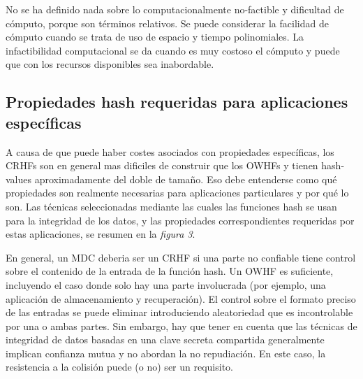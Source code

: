 \documentclass[a4paper, 12pt]{article} %
\begin{document}
No se ha definido nada sobre lo computacionalmente no-factible y dificultad de cómputo, porque son
términos relativos. Se puede considerar la facilidad de cómputo cuando se trata de uso de espacio y
tiempo polinomiales. La infactibilidad computacional se da cuando es muy costoso el cómputo y puede
que con los recursos disponibles sea inabordable.

\newpage
\subsection{Propiedades hash requeridas para aplicaciones específicas}
A causa de que puede haber costes asociados con propiedades específicas, los CRHFs son en general
mas dificiles de construir que los OWHFs y tienen hash-values aproximadamente del doble de tamaño.
Eso debe entenderse como qué propiedades son realmente necesarias para aplicaciones particulares y
por qué lo son. Las técnicas seleccionadas mediante las cuales las funciones hash se usan para
la integridad de los datos, y las propiedades correspondientes requeridas por estas aplicaciones,
se resumen en la \textit{figura 3}.

En general, un MDC deberia ser un CRHF si una parte no confiable tiene control sobre el contenido
de la entrada de la función hash. Un OWHF es suficiente, incluyendo el caso donde solo hay una
parte involucrada (por ejemplo, una aplicación de almacenamiento y recuperación).
El control sobre el formato preciso de las entradas se puede eliminar introduciendo aleatoriedad
que es incontrolable por una o ambas partes. Sin embargo, hay que tener en cuenta que las técnicas
de integridad de datos basadas en una clave secreta compartida generalmente implican confianza
mutua y no abordan la no repudiación. En este caso, la resistencia a la colisión puede (o no) ser
un requisito.
\end{document}

